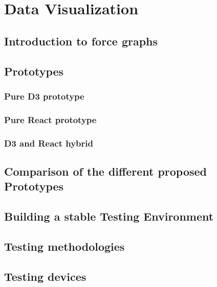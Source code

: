 \chapter{Data Visualization}

\section{Introduction to force graphs}

\section{Prototypes}

\subsection{Pure D3 prototype}

\subsection{Pure React prototype}

\subsection{D3 and React hybrid}

\section{Comparison of the different proposed Prototypes}

\section{Building a stable Testing Environment}

\section{Testing methodologies}

\section{Testing devices}
